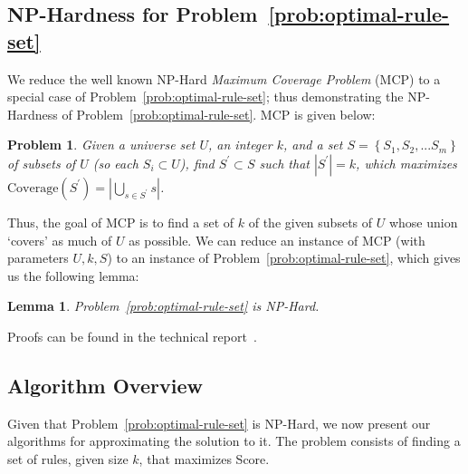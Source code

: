 \documentclass[10pt,journal,compsoc]{IEEEtran}
\newtheorem{lemma}{Lemma}
\newcounter{prob}
\newtheorem{problem}[prob]{Problem}
\newcommand{\techreporttext}[1]{}
\begin{document}
\subsection{NP-Hardness for Problem~\ref{prob:optimal-rule-set}}
We reduce the well known {\sc NP-Hard} {\em Maximum Coverage Problem} (MCP) to a special case of Problem~\ref{prob:optimal-rule-set};
thus demonstrating the {\sc NP-Hard}ness of Problem~\ref{prob:optimal-rule-set}. MCP is given below: 
\begin{problem}\label{prob:maximum-coverage}
Given a universe set $U$, an integer $k$, and a set $S = \left\lbrace S_1, S_2, ... S_m \right\rbrace$ of subsets of $U$ (so each $S_i \subset U$), find $S^{\prime} \subset S$ such that $|S^{\prime}| = k$, which maximizes $\text{Coverage}(S^{\prime}) = |\bigcup_{s \in S^{\prime}} s|$.
\end{problem}
Thus, the goal of MCP is to find a set of $k$ of the given subsets of $U$ whose union `covers' as much of $U$ as possible. We can reduce an instance of MCP (with parameters $U, k, S$) to an instance of Problem~\ref{prob:optimal-rule-set}, which gives us the following lemma:
\begin{lemma}
Problem~\ref{prob:optimal-rule-set} is {\sc NP-Hard}.
\end{lemma}
Proofs can be found in the technical report~\cite{tr}.
\techreporttext{
\begin{proof}
Consider a table with $|U|$ rows (one per element of $U$) and $m$ columns (one per $S_j$, that has value $1$ in row $i$, column $j$ if the $i^{th}$ belongs to $S_j$ and $0$ otherwise. And consider a weighting function with $W(r) = 1$ if there is at least one $1$ in $r$, and $0$ otherwise. Let $k \leq m$.

Then a rule with multiple $1$s is clearly dominated (or matched) by a subrule with only one $1$. Moreover, a rule-list that has two rules with a $1$ in the same column is dominated by one that that $1$s in different columns. Then the score of a rule list that has rules with $1$s in column set $C \subset \{1, 2,\ldots m\}$ with $|C| = k$ has score equal to the size of union $\bigcup_{c \in C} S_c$. Thus maximizing score is equivalent to maximizing the size of the union of $k$ sets, which is the Maximum Coverage Problem. Thus the NP-Hardness of Maximum Coverage implies that Score maximization is NP-hard.
\end{proof}
}

\subsection{Algorithm Overview}\label{sec:alg-overview}
Given that Problem~\ref{prob:optimal-rule-set} is {\sc NP-Hard}, we now present our algorithms 
for approximating the solution to it. 
The problem consists of finding a set of rules, given size $k$, that maximizes 
Score. 
\end{document}
